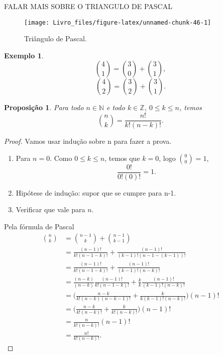 \documentclass[]{book}
\newtheorem{proposition}{Proposição}[chapter]
\theoremstyle{definition}
\theoremstyle{definition}
\newtheorem{example}{Exemplo}[chapter]
\theoremstyle{definition}
\theoremstyle{remark}
\begin{document}
FALAR MAIS SOBRE O TRIANGULO DE PASCAL

\begin{figure}

{\centering \texttt{[image: Livro\_files/figure-latex/unnamed-chunk-46-1]} 

}

\caption{Triângulo de Pascal.}\label{fig:unnamed-chunk-46}
\end{figure}

\begin{example}
\protect\hypertarget{exm:unnamed-chunk-47}{}{\label{exm:unnamed-chunk-47} }\[{4 \choose 1} = {3 \choose 0} + {3 \choose 1},\]
\[{4 \choose 2} = {3 \choose 2} + {3 \choose 1}.\]
\end{example}

\begin{proposition}
\protect\hypertarget{prp:unnamed-chunk-48}{}{\label{prp:unnamed-chunk-48} }Para todo \(n \in \mathbb{N}\) e todo \(k \in \mathbb{Z}\), \(0 \leq k \leq n\), temos
\[{n \choose k} = \frac{n!}{k!(n-k)!}.\]
\end{proposition}

\begin{proof}
\iffalse{} {Prova. } \fi{}Vamos usar indução sobre n para fazer a prova.

\begin{enumerate}
\def\labelenumi{\arabic{enumi}.}
\item
  Para \(n=0\). Como \(0 \leq k \leq n\), temos que \(k=0\), logo \({0 \choose 0} =1\),
  \[\frac{0!}{0!(0)!}=1.\]
\item
  Hipótese de indução: supor que se cumpre para n-1.
\item
  Verificar que vale para \(n\).
\end{enumerate}

Pela fórmula de Pascal
\begin{align}
{n \choose k} &= {n-1 \choose k} + {n-1 \choose k-1} \\
&= \frac{(n-1)!}{k!(n-1-k)!} + \frac{(n-1)!}{(k-1)!(n-1-(k-1))!} \\
&= \frac{(n-1)!}{k!(n-1-k)!} + \frac{(n-1)!}{(k-1)!(n-k)!} \\
&= \frac{(n-k)}{(n-k)}\frac{(n-1)!}{k!(n-1-k)!} + \frac{k}{k}\frac{(n-1)!}{(k-1)!(n-k)!} \\
&= \bigg(\frac{n-k}{k!(n-k)(n-k-1)!} + \frac{k}{k(k-1)!(n-k)!} \bigg)(n-1)! \\
&= \bigg(\frac{n-k}{k!(n-k)!} + \frac{k}{k!(n-k)!} \bigg)(n-1)! \\
&= \frac{n}{k!(n-k)!}(n-1)! \\
&= \frac{n!}{k!(n-k)!}.
\end{align}
\end{proof}
\end{document}

